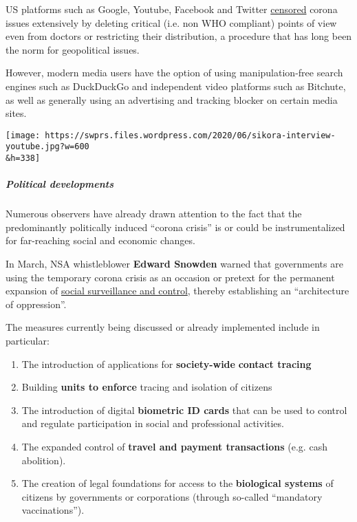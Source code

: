 US platforms such as Google, Youtube, Facebook and Twitter
\href{https://nypost.com/2020/05/16/youtube-censors-epidemiologist-knut-wittkowski-for-opposing-lockdown/}{censored}
corona issues extensively by deleting critical (i.e. non WHO compliant)
points of view even from doctors or restricting their distribution, a
procedure that has long been the norm for geopolitical issues.

However, modern media users have the option of using manipulation-free
search engines such as DuckDuckGo and independent video platforms such
as Bitchute, as well as generally using an advertising and tracking
blocker on certain media sites.

\texttt{[image: https://swprs.files.wordpress.com/2020/06/sikora-interview-youtube.jpg?w=600\\\&h=338]}

\hypertarget{political-developments}{%
\subparagraph{\texorpdfstring{\textbf{Political
developments}}{Political developments}}\label{political-developments}}

Numerous observers have already drawn attention to the fact that the
predominantly politically induced ``corona crisis'' is or could be
instrumentalized for far-reaching social and economic changes.

In March, NSA whistleblower \textbf{Edward Snowden} warned that
governments are using the temporary corona crisis as an occasion or
pretext for the permanent expansion of
\href{https://www.youtube.com/watch?v=-pcQFTzck_c}{social surveillance
and control}, thereby establishing an ``architecture of oppression''.

The measures currently being discussed or already implemented include in
particular:

\begin{enumerate}
\def\labelenumi{\arabic{enumi}.}
\tightlist
\item
  The introduction of applications for \textbf{society-wide}
  \textbf{contact tracing}
\item
  Building \textbf{units to enforce} tracing and isolation of citizens
\item
  The introduction of digital \textbf{biometric ID cards} that can be
  used to control and regulate participation in social and professional
  activities.
\item
  The expanded control of \textbf{travel and payment transactions} (e.g.
  cash abolition).
\item
  The creation of legal foundations for access to the \textbf{biological
  systems} of citizens by governments or corporations (through so-called
  ``mandatory vaccinations'').
\end{enumerate}


